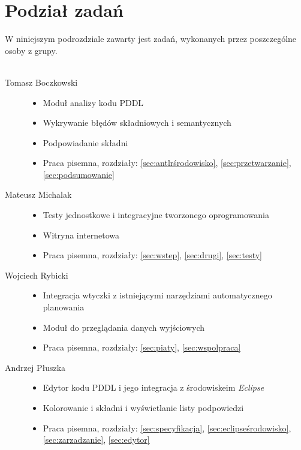 \section{Podział zadań}
W niniejszym podrozdziale zawarty jest zadań, wykonanych przez poszczególne osoby z grupy.\\\\
\begin{description}
  \item[Tomasz Boczkowski] \hfill 
  \begin{itemize}
\item Moduł analizy kodu PDDL
\item Wykrywanie błędów składniowych i semantycznych
\item Podpowiadanie składni
\item Praca pisemna, rozdziały: \ref{sec:antlrśrodowisko}, \ref{sec:przetwarzanie}, \ref{sec:podsumowanie}
\end{itemize}
  \item[Mateusz Michalak] \hfill 
    \begin{itemize}
\item Testy jednostkowe i integracyjne tworzonego oprogramowania
\item Witryna internetowa
\item Praca pisemna, rozdziały: \ref{sec:wstep}, \ref{sec:drugi}, \ref{sec:testy}
\end{itemize}
  \item[Wojciech Rybicki] \hfill 
    \begin{itemize}
\item Integracja wtyczki z istniejącymi narzędziami automatycznego planowania
\item Moduł do przeglądania danych wyjściowych
\item Praca pisemna, rozdziały: \ref{sec:piaty}, \ref{sec:wspolpraca}
\end{itemize}
  \item[Andrzej Płuszka] \hfill 
    \begin{itemize}
\item Edytor kodu PDDL i jego integracja z środowiskeim \textit{Eclipse}
\item Kolorowanie i składni i wyświetlanie listy podpowiedzi
\item Praca pisemna, rozdziały: \ref{sec:specyfikacja}, \ref{sec:eclipseśrodowisko}, \ref{sec:zarzadzanie}, \ref{sec:edytor}
\end{itemize}
\end{description}




